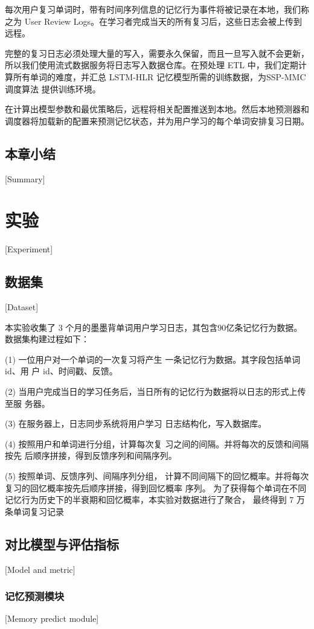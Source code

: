 每次用户复习单词时，带有时间序列信息的记忆行为事件将被记录在本地，我们称之为 User Review Logs。在学习者完成当天的所有复习后，这些日志会被上传到远程。

完整的复习日志必须处理大量的写入，需要永久保留，而且一旦写入就不会更新，所以我们使用流式数据服务将日志写入数据仓库。在预处理 ETL 中，我们定期计算所有单词的难度，并汇总 LSTM-HLR 记忆模型所需的训练数据，为SSP-MMC调度算法 提供训练环境。

在计算出模型参数和最优策略后，远程将相关配置推送到本地。然后本地预测器和调度器将加载新的配置来预测记忆状态，并为用户学习的每个单词安排复习日期。

\section{本章小结}[Summary]

\chapter{实验}[Experiment]

\section{数据集}[Dataset]

本实验收集了 3 个月的墨墨背单词用户学习日志，其包含90亿条记忆行为数据。数据集构建过程如下：

(1) 一位用户对一个单词的一次复习将产生 一条记忆行为数据。其字段包括单词 id、用 户 id、时间戳、反馈。

(2) 当用户完成当日的学习任务后，当日所有的记忆行为数据将以日志的形式上传至服 务器。

(3) 在服务器上，日志同步系统将用户学习 日志结构化，写入数据库。

(4) 按照用户和单词进行分组，计算每次复 习之间的间隔。并将每次的反馈和间隔按先 后顺序拼接，得到反馈序列和间隔序列。

(5) 按照单词、反馈序列、间隔序列分组， 计算不同间隔下的回忆概率。并将每次复习的回忆概率按先后顺序拼接，得到回忆概率 序列。 为了获得每个单词在不同记忆行为历史下的半衰期和回忆概率，本实验对数据进行了聚合， 最终得到 7 万条单词复习记录

\section{对比模型与评估指标}[Model and metric]

\subsection{记忆预测模块}[Memory predict module]

